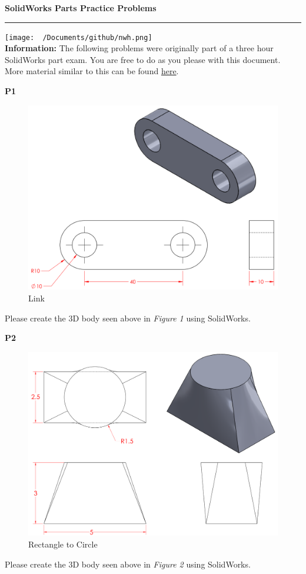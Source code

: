 \documentclass{article}
\begin{document}
\pagecolor{noah}
\center
\Huge{\textbf{SolidWorks Parts Practice Problems}\\[3mm] \hrule
\vspace{4mm}
\texttt{[image: ~/Documents/github/nwh.png]}\\[4mm] 
\justify\normalsize
\textbf{Information:} The following problems were originally part of a three hour SolidWorks part exam. You are free to do as you please with this document. More material similar to this can be found \href{https://github.com/noahhaworth/CAD_Material}{here}.\\[10mm]
\newpage
{}

\textbf{P1}
\begin{figure}[H]
  \centering
  \includegraphics[width=.68\linewidth]{images/1.png}  
  \caption{Link}
  \label{fig:1}
\end{figure}
\noindent Please create the 3D body seen above in \textit{Figure 1} using SolidWorks.

\textbf{P2}
\begin{figure}[H]
  \centering
  \includegraphics[width=.68\linewidth]{images/2.png}  
  \caption{Rectangle to Circle}
  \label{fig:2}
\end{figure}
\noindent Please create the 3D body seen above in \textit{Figure 2} using SolidWorks.

}
\end{document}

